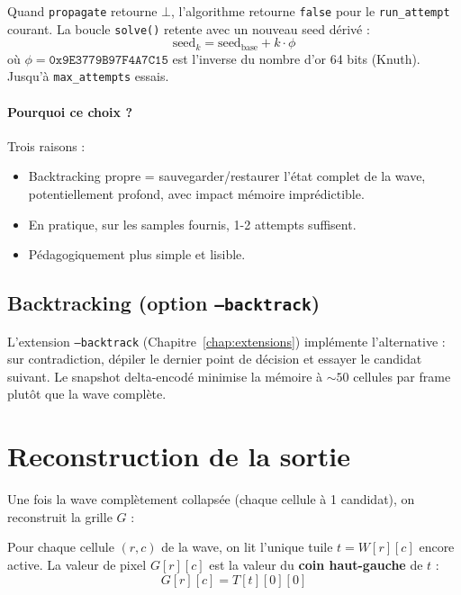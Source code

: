 Quand \texttt{propagate} retourne $\bot$, l'algorithme retourne \texttt{false} pour le \texttt{run\_attempt} courant. La boucle \texttt{solve()} retente avec un nouveau seed dérivé :
\[
\text{seed}_k = \text{seed}_{\text{base}} + k \cdot \phi
\]
où $\phi = \texttt{0x9E3779B97F4A7C15}$ est l'inverse du nombre d'or 64 bits (Knuth). Jusqu'à \texttt{max\_attempts} essais.

\paragraph{Pourquoi ce choix ?} Trois raisons :
\begin{itemize}
    \item Backtracking propre = sauvegarder/restaurer l'état complet de la wave, potentiellement profond, avec impact mémoire imprédictible.
    \item En pratique, sur les samples fournis, 1-2 attempts suffisent.
    \item Pédagogiquement plus simple et lisible.
\end{itemize}

\subsection{Backtracking (option \texttt{--backtrack})}

L'extension \texttt{--backtrack} (Chapitre~\ref{chap:extensions}) implémente l'alternative : sur contradiction, dépiler le dernier point de décision et essayer le candidat suivant. Le snapshot delta-encodé minimise la mémoire à $\sim 50$ cellules par frame plutôt que la wave complète.

\section{Reconstruction de la sortie}
\label{sec:approche:output}

Une fois la wave complètement collapsée (chaque cellule à 1 candidat), on reconstruit la grille $G$ :

\begin{definition}[Reconstruction]
Pour chaque cellule $(r, c)$ de la wave, on lit l'unique tuile $t = W[r][c]$ encore active. La valeur de pixel $G[r][c]$ est la valeur du \textbf{coin haut-gauche} de $t$ :
\[
G[r][c] = T[t][0][0]
\]
\end{definition}

